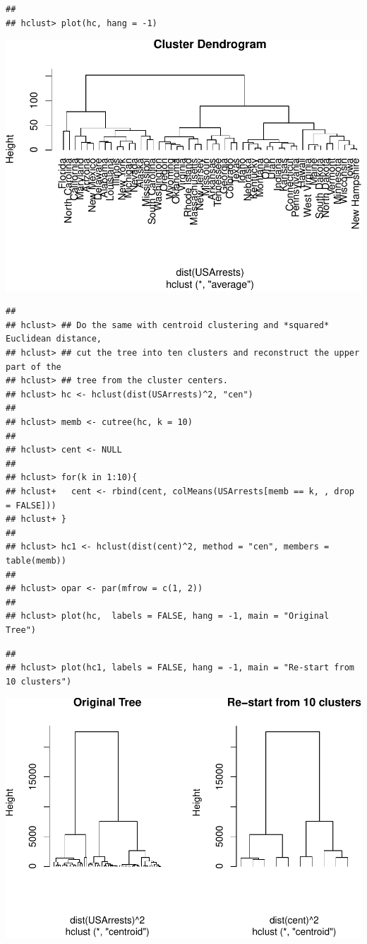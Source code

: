 \documentclass[
]{book}
\begin{document}
\begin{verbatim}
## 
## hclust> plot(hc, hang = -1)
\end{verbatim}

\includegraphics{bookdown-demo_files/figure-latex/unnamed-chunk-11-2.pdf}

\begin{verbatim}
## 
## hclust> ## Do the same with centroid clustering and *squared* Euclidean distance,
## hclust> ## cut the tree into ten clusters and reconstruct the upper part of the
## hclust> ## tree from the cluster centers.
## hclust> hc <- hclust(dist(USArrests)^2, "cen")
## 
## hclust> memb <- cutree(hc, k = 10)
## 
## hclust> cent <- NULL
## 
## hclust> for(k in 1:10){
## hclust+   cent <- rbind(cent, colMeans(USArrests[memb == k, , drop = FALSE]))
## hclust+ }
## 
## hclust> hc1 <- hclust(dist(cent)^2, method = "cen", members = table(memb))
## 
## hclust> opar <- par(mfrow = c(1, 2))
## 
## hclust> plot(hc,  labels = FALSE, hang = -1, main = "Original Tree")
\end{verbatim}

\begin{verbatim}
## 
## hclust> plot(hc1, labels = FALSE, hang = -1, main = "Re-start from 10 clusters")
\end{verbatim}

\includegraphics{bookdown-demo_files/figure-latex/unnamed-chunk-11-3.pdf}
\end{document}
